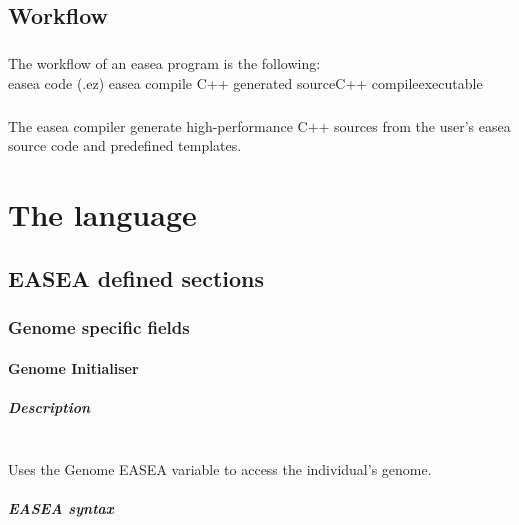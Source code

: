\documentclass{book}
\begin{document}
\section{Workflow} %
\label{sec:Workflow}
\paragraph{} %
\label{par:}

The workflow of an easea program is the following:\\
easea code (.ez) \rightarrow easea compile \rightarrow C++ generated
source\rightarrow C++ compile\rightarrow executable 
\paragraph{} %
\label{par:}

The easea compiler generate high-performance C++ sources from the user's easea source
code and predefined templates.


\chapter{The language} %
\label{sec:the language}
 \section{EASEA defined sections} %
 \label{sub:EASEA defined sections}
 
\subsection{Genome specific fields}\label{genome-specific-fields}

\subsubsection{Genome Initialiser}\label{genome-initialiser}

\paragraph{Description}\label{description}
~\\
Uses the Genome EASEA variable
to access the individual's genome.

\paragraph{EASEA syntax}\label{easea-syntax}
~\\
\end{document}
